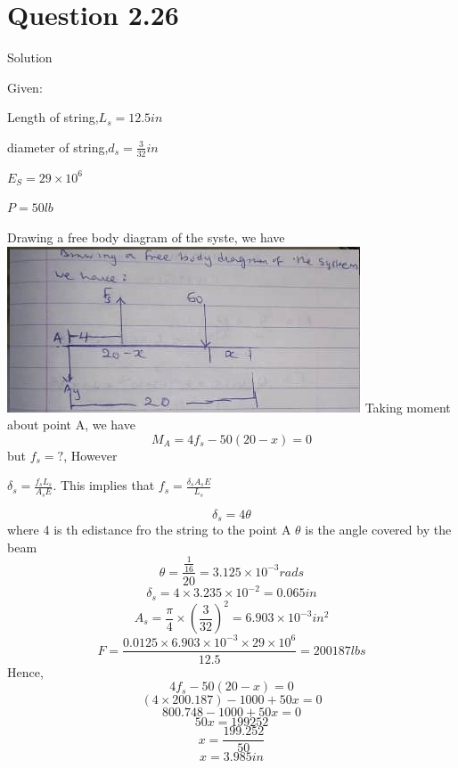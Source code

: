 \documentclass{article}
\begin{document}
\section*{Question 2.26}
\begin{center} Solution\end{center}
Given:
\begin{center}Length of string,$ L_{s} = 12.5 in$\end{center}
\begin{center}diameter of string,$d_{s} = \frac{3}{32}in$\end{center}
\begin{center}$E_{S} = 29 \times 10^{6}$\end{center}
\begin{center}$P = 50lb$\end{center}
Drawing a free body diagram of the syste, we have \newline
\includegraphics{IMG-20220126-WA0004}\newline
Taking moment about point A, we have
\[M_{A} = 4f_{s} - 50 (20 -x) = 0\]
but $f_{s} = ?$, However
\begin{center}$\delta_{s} = \frac{f_{s}L_{s}}{A_{s}E}$.  This implies that $f_{s} = \frac{\delta_{s}A_{s}E}{L_{s}}$\end{center}
\[\delta_{s} = 4 \theta\]
where 4 is th edistance fro the string to the point A
\newline
$\theta$ is the angle covered by the beam
\[\theta = \frac{\frac{1}{16}}{20} = 3.125 \times 10^{-3}rads\]
\[\delta_{s} = 4\times 3.235 \times 10^{-2} = 0.065in\]
\[A_{s} = \frac{\pi}{4} \times (\frac{3}{32})^{2} = 6.903 \times 10^{-3}in^{2}\]
\[F = \frac{0.0125 \times 6.903 \times 10^{-3} \times 29 \times 10^{6}}{12.5} = 200187lbs\]
Hence,
\[4f_{s} - 50(20-x) = 0\]
\[(4\times200.187) - 1000 + 50x = 0\]
\[800.748 - 1000 + 50x = 0\]
\[50x = 199252\]
\[ x = \frac{199.252}{50}\]
\[x = 3.985in\]


\end{document}
